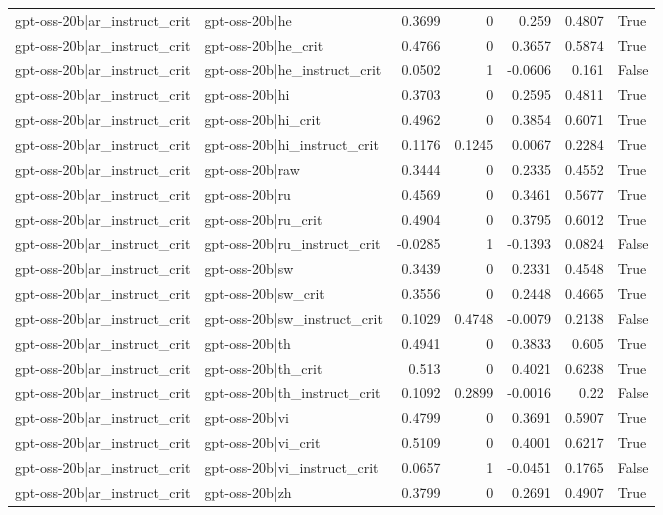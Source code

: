 \begin{table}
\begin{tabular}{l l r r r r l}
gpt-oss-20b|ar_instruct_crit & gpt-oss-20b|he & 0.3699 & 0 & 0.259 & 0.4807 & True \\
gpt-oss-20b|ar_instruct_crit & gpt-oss-20b|he_crit & 0.4766 & 0 & 0.3657 & 0.5874 & True \\
gpt-oss-20b|ar_instruct_crit & gpt-oss-20b|he_instruct_crit & 0.0502 & 1 & -0.0606 & 0.161 & False \\
gpt-oss-20b|ar_instruct_crit & gpt-oss-20b|hi & 0.3703 & 0 & 0.2595 & 0.4811 & True \\
gpt-oss-20b|ar_instruct_crit & gpt-oss-20b|hi_crit & 0.4962 & 0 & 0.3854 & 0.6071 & True \\
gpt-oss-20b|ar_instruct_crit & gpt-oss-20b|hi_instruct_crit & 0.1176 & 0.1245 & 0.0067 & 0.2284 & True \\
gpt-oss-20b|ar_instruct_crit & gpt-oss-20b|raw & 0.3444 & 0 & 0.2335 & 0.4552 & True \\
gpt-oss-20b|ar_instruct_crit & gpt-oss-20b|ru & 0.4569 & 0 & 0.3461 & 0.5677 & True \\
gpt-oss-20b|ar_instruct_crit & gpt-oss-20b|ru_crit & 0.4904 & 0 & 0.3795 & 0.6012 & True \\
gpt-oss-20b|ar_instruct_crit & gpt-oss-20b|ru_instruct_crit & -0.0285 & 1 & -0.1393 & 0.0824 & False \\
gpt-oss-20b|ar_instruct_crit & gpt-oss-20b|sw & 0.3439 & 0 & 0.2331 & 0.4548 & True \\
gpt-oss-20b|ar_instruct_crit & gpt-oss-20b|sw_crit & 0.3556 & 0 & 0.2448 & 0.4665 & True \\
gpt-oss-20b|ar_instruct_crit & gpt-oss-20b|sw_instruct_crit & 0.1029 & 0.4748 & -0.0079 & 0.2138 & False \\
gpt-oss-20b|ar_instruct_crit & gpt-oss-20b|th & 0.4941 & 0 & 0.3833 & 0.605 & True \\
gpt-oss-20b|ar_instruct_crit & gpt-oss-20b|th_crit & 0.513 & 0 & 0.4021 & 0.6238 & True \\
gpt-oss-20b|ar_instruct_crit & gpt-oss-20b|th_instruct_crit & 0.1092 & 0.2899 & -0.0016 & 0.22 & False \\
gpt-oss-20b|ar_instruct_crit & gpt-oss-20b|vi & 0.4799 & 0 & 0.3691 & 0.5907 & True \\
gpt-oss-20b|ar_instruct_crit & gpt-oss-20b|vi_crit & 0.5109 & 0 & 0.4001 & 0.6217 & True \\
gpt-oss-20b|ar_instruct_crit & gpt-oss-20b|vi_instruct_crit & 0.0657 & 1 & -0.0451 & 0.1765 & False \\
gpt-oss-20b|ar_instruct_crit & gpt-oss-20b|zh & 0.3799 & 0 & 0.2691 & 0.4907 & True \\

\end{tabular}
\end{table}
